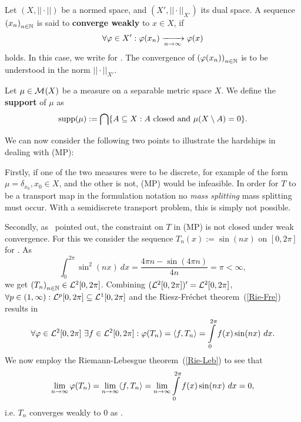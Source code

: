\begin{definition}\label{WeakCon}
	Let $(X, ||\cdot||)$ be a normed space, and $(X', ||\cdot||_{X'})$ its dual space. A sequence ${(x_n)}_{n \in \mathbb{N}}$ is said to \textbf{converge weakly} to $x \in X$, if
	\[ \forall \varphi \in X': \varphi(x_n) \xrightarrow[n \rightarrow \infty]{} \varphi(x) \]
	holds. In this case, we write  for \Ninf. The convergence of ${(\varphi(x_n))}_{n \in \mathbb{N}}$ is to be understood in the norm $||\cdot||_{X'}$.
\end{definition}

\begin{definition}\label{Supp}
	Let $\mu \in \mathcal{M}_{}(X)$ be a measure on a separable metric space $X$. We define the \textbf{support} of $\mu$ as
	\[ \text{supp}(\mu) := \bigcap \{ A \subseteq X : A \text{ closed and } \mu(X \setminus A) = 0 \}. \]
\end{definition}

We can now consider the following two points to illustrate the hardships in dealing with (MP):

Firstly, if one of the two measures were to be discrete, for example of the form $\mu = \delta_{x_0}, x_0 \in X$, and the other is not, (MP) would be infeasible. In order for $T$ to be a transport map in the formulation notation no \textit{mass splitting} mass splitting must occur. With a semidiscrete transport problem, this is simply not possible.

Secondly, as~\cite{San2015} pointed out, the constraint on $T$ in (MP) is not closed under weak convergence. For this we consider the sequence $T_n(x) := \sin(nx)$ on $[0, 2 \pi]$ for \NinN. As
\[ \int_0^{2 \pi} \sin^2(nx)~dx = \frac{4 \pi n - \sin(4\pi n)}{4n} = \pi < \infty, \]
we get ${(T_n)}_{n \in \mathbb{N}} \in \mathcal{L}^{2}[0, 2 \pi]$. Combining $(\mathcal{L}^{2}[0, 2 \pi])' = \mathcal{L}^{2}[0, 2 \pi]$, $\forall p \in (1, \infty) : \mathcal{L}^{p}[0, 2\pi] \subseteq \mathcal{L}^{1}[0, 2\pi]$ and the Riesz-Fr\'{e}chet theorem~(\ref{Rie-Fre}) results in
\[ \forall \varphi \in \mathcal{L}^{2}[0, 2\pi]~\exists f \in \mathcal{L}^{2}[0, 2\pi]: \varphi(T_n) = \langle f, T_n \rangle = \int\limits_0^{2\pi} f(x) \sin(nx)~dx. \]
We now employ the Riemann-Lebesgue theorem~(\ref{Rie-Leb}) to see that
\[ \lim\limits_{n \rightarrow \infty} \varphi(T_n) = \lim\limits_{n \rightarrow \infty} \langle f, T_n \rangle = \lim\limits_{n \rightarrow \infty} \int\limits_0^{2\pi} f(x) \sin(nx)~dx = 0, \]
i.e. $T_n$ converges weakly to $0$ as \Ninf.

